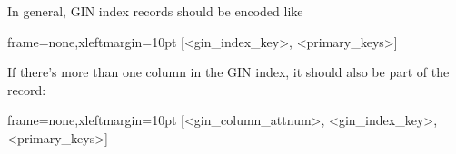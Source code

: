 In general, GIN index records should be encoded like

\begin{textcode*}{frame=none,xleftmargin=10pt}
[<gin_index_key>, <primary_keys>]
\end{textcode*}

If there's more than one column in the GIN index, it should also be part of the
record:

\begin{textcode*}{frame=none,xleftmargin=10pt}
[<gin_column_attnum>, <gin_index_key>, <primary_keys>]
\end{textcode*}
